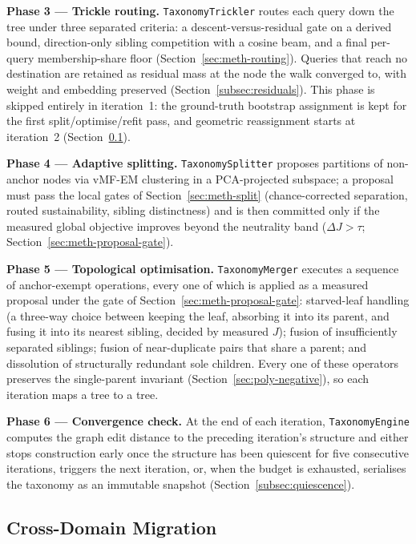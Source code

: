 \textbf{Phase 3 --- Trickle routing.}
\texttt{TaxonomyTrickler} routes each query down the tree under three
separated criteria: a descent-versus-residual gate on a derived bound,
direction-only sibling competition with a cosine beam, and a final
per-query membership-share floor
(Section~\ref{sec:meth-routing}).
Queries that reach no destination are retained as residual mass at
the node the walk converged to, with weight and embedding preserved
(Section~\ref{subsec:residuals}).
This phase is skipped entirely in iteration~1: the ground-truth
bootstrap assignment is kept for the first split/optimise/refit pass,
and geometric reassignment starts at iteration~2
(Section~\ref{subsec:migration}).

\textbf{Phase 4 --- Adaptive splitting.}
\texttt{TaxonomySplitter} proposes partitions of non-anchor nodes via
vMF-EM clustering in a PCA-projected subspace; a proposal must pass
the local gates of Section~\ref{sec:meth-split}
(chance-corrected separation, routed sustainability, sibling
distinctness) and is then committed only if the measured global
objective improves beyond the neutrality band
($\Delta J > \tau$; Section~\ref{sec:meth-proposal-gate}).

\textbf{Phase 5 --- Topological optimisation.}
\texttt{TaxonomyMerger} executes a sequence of anchor-exempt
operations, every one of which is applied as a measured proposal
under the gate of Section~\ref{sec:meth-proposal-gate}:
starved-leaf handling (a three-way choice between keeping the leaf,
absorbing it into its parent, and fusing it into its nearest
sibling, decided by measured $J$); fusion of insufficiently separated
siblings; fusion of near-duplicate pairs that share a parent; and
dissolution of structurally redundant sole children.
Every one of these operators preserves the single-parent invariant
(Section~\ref{sec:poly-negative}), so
each iteration maps a tree to a tree.

\textbf{Phase 6 --- Convergence check.}
At the end of each iteration, \texttt{TaxonomyEngine} computes the
graph edit distance to the preceding iteration's structure and either
stops construction early once the structure has been quiescent for five
consecutive iterations, triggers the next iteration, or, when the
budget is exhausted, serialises the taxonomy as an immutable snapshot
(Section~\ref{subsec:quiescence}).

\subsection{Cross-Domain Migration}\label{subsec:migration}\label{sec:meth-migration}

